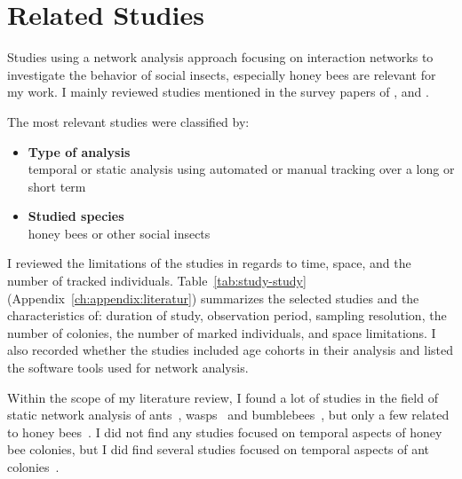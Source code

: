 \section{Related Studies}
\label{ch:relatedwork}

Studies using a network analysis approach focusing on interaction networks to investigate the behavior of social insects, especially honey bees are relevant for my work.
I mainly reviewed studies mentioned in the survey papers of \textcite{Pinter-Wollman2014}, \textcite[Chapter~15]{krause2014animal} and \textcite{charbonneau2013social}.

The most relevant studies were classified by:

\begin{itemize}
\item \textbf{Type of analysis}\\
temporal or static analysis using automated or manual tracking over a long or short term
\item \textbf{Studied species}\\
honey bees or other social insects
\end{itemize}

I reviewed the limitations of the studies in regards to time, space, and the number of tracked individuals. Table~\ref{tab:study-study} (Appendix~\ref{ch:appendix:literatur}) summarizes the selected studies and the characteristics of: duration of study, observation period, sampling resolution, the number of colonies, the number of marked individuals, and space limitations.
I also recorded whether the studies included age cohorts in their analysis and listed the software tools used for network analysis.

Within the scope of my literature review, I found a lot of studies in the field of static network analysis of ants~\cite{greenwald2015ant,pinter2011effect,quevillon2015social,formica2012fitness,waters2012information,sendova2010emergency}, wasps~\cite{naug2009structure} and bumblebees~\cite{otterstatter2007contact}, but only a few related to honey bees~\cite{baracchi2014socio,naug2008structure,scholl2011olfactory,naug2007experimentally}.
I did not find any studies focused on temporal aspects of honey bee colonies, but I did find several studies focused on temporal aspects of ant colonies~\cite{mersch2013tracking,blonder2011time,jeanson2012long}.

